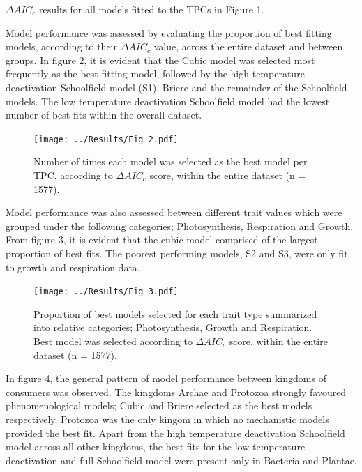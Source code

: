 \documentclass[11pt]{article}
\begin{document}
\begin{linenumbers}
\vspace{0.3cm}
\begin{table}[H]
\FloatBarrier
\centering
\caption{\(\Delta AIC_c\) results for all models fitted to the TPCs in Figure 1.}
\begin{adjustbox}{height = 1.3cm, width=12cm}
	
	\FloatBarrier
\end{adjustbox}
\end{table}
\vspace{0.5cm}
Model performance was assessed by evaluating the proportion of best fitting models, according to their \(\Delta AIC_c\) value, across the entire dataset and between groups. In figure 2, it is evident that the Cubic model was selected most frequently as the best fitting model, followed by the high temperature deactivation Schoolfield model (S1), Briere and the remainder of the Schoolfield models. The low temperature deactivation Schoolfield model had the lowest number of best fits within the overall dataset. 

\begin{figure}[H]
 	\texttt{[image: ../Results/Fig\_2.pdf]}
 	\centering
 	\caption{Number of times each model was selected as the best model per TPC, according to \(\Delta AIC_c\) score, within the entire dataset (n = 1577).}
\end{figure}

Model performance was also assessed between different trait values which were grouped under the following categories; Photosynthesis, Respiration and Growth. From figure 3, it is evident that the cubic model comprised of the largest proportion of best fits. The poorest performing models, S2 and S3, were only fit to growth and respiration data.

\begin{figure}[H]
	\texttt{[image: ../Results/Fig\_3.pdf]}
	\centering
	\caption{Proportion of  best models selected for each trait type summarized into relative categories; Photosynthesis, Growth and Respiration. Best model was selected according to \(\Delta AIC_c\) score, within the entire dataset (n = 1577).}
\end{figure}

In figure 4, the general pattern of model performance between kingdoms of consumers was observed. The kingdoms Archae and Protozoa strongly favoured phenomenological models; Cubic and Briere selected as the best models respectively. Protozoa was the only kingom in which no mechanistic models provided the best fit. Apart from the high temperature deactivation Schoolfield model across all other kingdoms, the best fits for the low temperature deactivation and full Schoolfield model were present only in Bacteria and Plantae.


\end{linenumbers}
\end{document}
